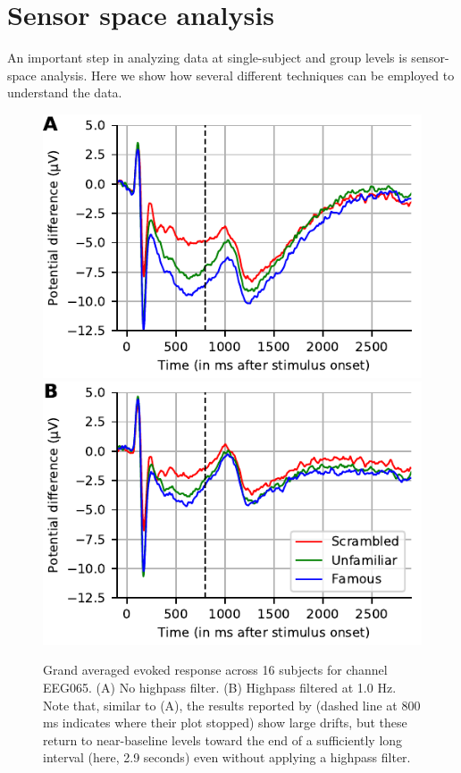 \section{Sensor space analysis}
An important step in analyzing data at single-subject and group levels is sensor-space analysis. Here we show how several different techniques can be employed to understand the data.

\begin{figure}[t]
  \includegraphics{figures/grand_average_highpass-NoneHz.pdf}
  \includegraphics{figures/grand_average_highpass-1Hz.pdf}
  \vspace{-10pt}
\caption{Grand averaged evoked response across 16 subjects for channel EEG065.
(A) No highpass filter. (B) Highpass filtered at 1.0 Hz. Note that, similar to (A), the results reported by \cite{wakeman2015multi} (dashed line at 800 ms indicates where their plot stopped) show large drifts, but these return to near-baseline levels toward the end of a sufficiently long interval (here, 2.9 seconds) even without applying a highpass filter.}
\label{fig:grand_average}
\end{figure}  

